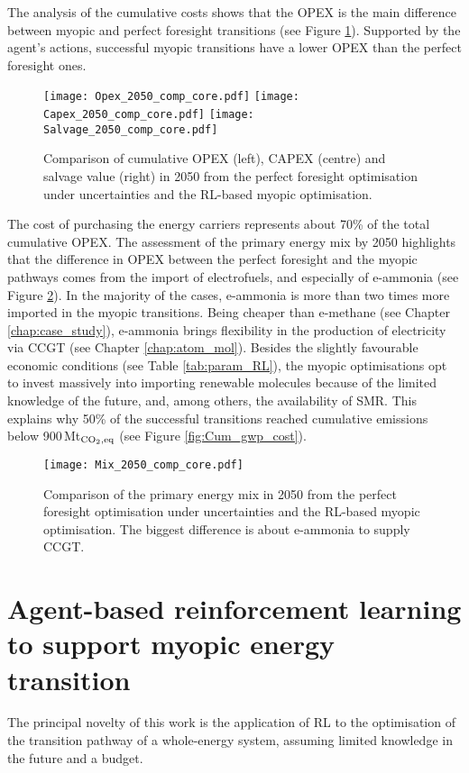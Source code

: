 \documentclass[11pt,twoside,a4paper,english]{article}
\begin{document}
The analysis of the cumulative costs shows that the \gls{OPEX} is the main difference between myopic and perfect foresight transitions (see Figure \ref{fig:Opex_Capex_Salvage_comp}). Supported by the agent's actions, successful myopic transitions have a lower \gls{OPEX} than the perfect foresight ones.

\begin{figure}[!htbp]
\centering
\texttt{[image: Opex\_2050\_comp\_core.pdf]}
\texttt{[image: Capex\_2050\_comp\_core.pdf]}
\texttt{[image: Salvage\_2050\_comp\_core.pdf]}
\caption{Comparison of cumulative OPEX (left), CAPEX (centre) and salvage value (right) in 2050 from the perfect foresight optimisation under uncertainties and the \gls{RL}-based myopic optimisation.}
\label{fig:Opex_Capex_Salvage_comp}
\end{figure}

The cost of purchasing the energy carriers represents about 70\% of the total cumulative \gls{OPEX}. The assessment of the primary energy mix by 2050 highlights that the difference in OPEX between the perfect foresight and the myopic pathways comes from the import of electrofuels, and especially of e-ammonia (see Figure \ref{fig:Mix_2050_comp}).  In the majority of the cases, e-ammonia is more than two times more imported in the myopic transitions. Being cheaper than e-methane (see Chapter \ref{chap:case_study}), e-ammonia brings flexibility in the production of electricity via \gls{CCGT} (see Chapter \ref{chap:atom_mol}). Besides the slightly favourable economic conditions (see Table \ref{tab:param_RL}), the myopic optimisations opt to invest massively into importing renewable molecules because of the limited knowledge of the future, and, among others, the availability of \gls{SMR}. This explains why 50\% of the successful transitions reached cumulative emissions below 900\,Mt$_{\ce{CO2},\text{eq}}$ (see Figure \ref{fig:Cum_gwp_cost}).

\begin{figure}[!htbp]
\centering
\texttt{[image: Mix\_2050\_comp\_core.pdf]}
\caption{Comparison of the primary energy mix in 2050 from the perfect foresight optimisation under uncertainties and the \gls{RL}-based myopic optimisation. The biggest difference is about e-ammonia to supply \gls{CCGT}.}
\label{fig:Mix_2050_comp}
\end{figure}

\section{Agent-based reinforcement learning to support myopic energy transition}
The principal novelty of this work is the application of \gls{RL} to the optimisation of the transition pathway of a whole-energy system, assuming limited knowledge in the future and a  budget.  
\end{document}
